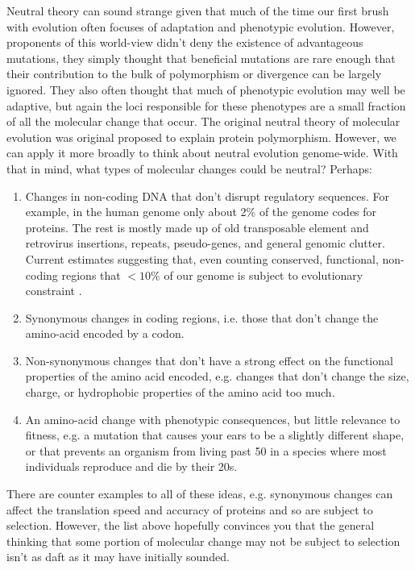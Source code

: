 Neutral theory can sound strange given that much of the time our first brush with evolution often focuses of adaptation and phenotypic evolution. However, proponents of this world-view didn't deny the existence of advantageous mutations, they simply thought that beneficial mutations are rare enough that their contribution to the bulk of polymorphism or divergence can be largely ignored. They also often thought that much of phenotypic evolution may well be adaptive, but again the loci responsible for these phenotypes are a small fraction of all the molecular change that occur. The original neutral theory of molecular evolution was original proposed to explain protein polymorphism. However, we can apply it more broadly to think about neutral evolution genome-wide. With that in mind, what types of molecular changes could be neutral? Perhaps:
\begin{enumerate}
\item Changes in non-coding DNA that don't disrupt regulatory sequences. For example, in the human genome only about 2\% of the genome codes for proteins. The rest is mostly made up of old transposable element and retrovirus insertions, repeats, pseudo-genes, and general genomic clutter. Current estimates suggesting that, even counting conserved, functional, non-coding regions that $<10\%$ of our genome is subject to evolutionary constraint \citep{rands:14}.   
\item Synonymous changes in coding regions, i.e. those that don't change the amino-acid encoded by a codon.
\item Non-synonymous changes that don't have a strong effect on the functional properties of the amino acid encoded, e.g. changes that don't change the size, charge, or hydrophobic properties of the amino acid too much.
\item An amino-acid change with phenotypic consequences, but little relevance to fitness, e.g. a mutation that causes your ears to be a slightly different shape, or that prevents an organism from living past 50 in a species where most individuals reproduce and die by their 20s.
\end{enumerate}
There are counter examples to all of these ideas, e.g. synonymous changes can affect the translation speed and accuracy of proteins and so are subject to selection. However, the list above hopefully convinces you that the general thinking that some portion of molecular change may not be subject to selection isn't as daft as it may have initially sounded. 


